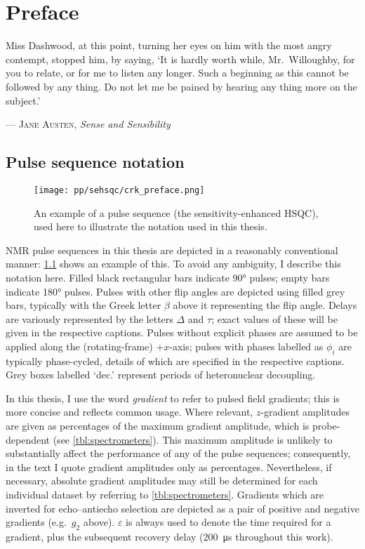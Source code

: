 \chapter{Preface}

\epigraph{\singlespacing%
Miss Dashwood, at this point, turning her eyes on him with the most angry contempt, stopped him, by saying, `It is hardly worth while, Mr.\ Willoughby, for you to relate, or for me to listen any longer. Such a beginning as this cannot be followed by any thing. Do not let me be pained by hearing any thing more on the subject.'
}{--- \textsc{Jane Austen}, \textit{Sense and Sensibility}}

\section*{Pulse sequence notation}

\begin{figure}[ht]
    \centering
    \texttt{[image: pp/sehsqc/crk\_preface.png]}%
    \caption[Example pulse sequence to illustrate notation]{An example of a pulse sequence (the sensitivity-enhanced HSQC), used here to illustrate the notation used in this thesis.}
    \label{fig:preface_sehsqc}
\end{figure}

NMR pulse sequences in this thesis are depicted in a reasonably conventional manner: \cref{fig:preface_sehsqc} shows an example of this.
To avoid any ambiguity, I describe this notation here.
Filled black rectangular bars indicate \ang{90} pulses; empty bars indicate \ang{180} pulses.
Pulses with other flip angles are depicted using filled grey bars, typically with the Greek letter $\beta$ above it representing the flip angle.
Delays are variously represented by the letters $\Delta$ and $\tau$; exact values of these will be given in the respective captions.
Pulses without explicit phases are assumed to be applied along the (rotating-frame) $+x$-axis; pulses with phases labelled as $\phi_i$ are typically phase-cycled, details of which are specified in the respective captions.
Grey boxes labelled `dec.' represent periods of heteronuclear decoupling.

In this thesis, I use the word \textit{gradient} to refer to pulsed field gradients; this is more concise and reflects common usage.
Where relevant, $z$-gradient amplitudes are given as percentages of the maximum gradient amplitude, which is probe-dependent (see \cref{tbl:spectrometers}).
This maximum amplitude is unlikely to substantially affect the performance of any of the pulse sequences; consequently, in the text I quote gradient amplitudes only as percentages.
Nevertheless, if necessary, absolute gradient amplitudes may still be determined for each individual dataset by referring to \cref{tbl:spectrometers}.
Gradients which are inverted for echo--antiecho selection are depicted as a pair of positive and negative gradients (e.g.\ $g_2$ above).
$\varepsilon$ is always used to denote the time required for a gradient, plus the subsequent recovery delay (\qty{200}{\us} throughout this work).

